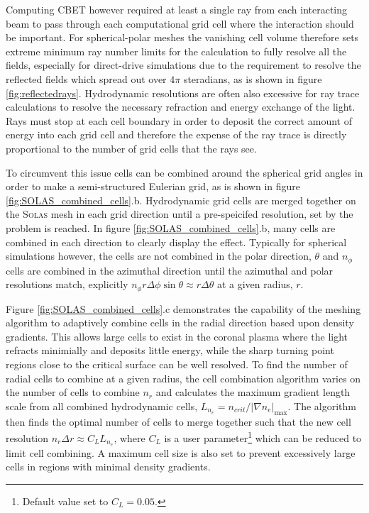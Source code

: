 Computing \ac{CBET} however required at least a single ray from each interacting beam to pass through each computational grid cell where the interaction should be important.
For spherical-polar meshes the vanishing cell volume therefore sets extreme minimum ray number limits for the calculation to fully resolve all the fields, especially for direct-drive simulations due to the requirement to resolve the reflected fields which spread out over $4\pi$ steradians, as is shown in figure \ref{fig:reflectedrays}.
Hydrodynamic resolutions are often also excessive for ray trace calculations to resolve the necessary refraction and energy exchange of the light.
Rays must stop at each cell boundary in order to deposit the correct amount of energy into each grid cell and therefore the expense of the ray trace is directly proportional to the number of grid cells that the rays see.

To circumvent this issue cells can be combined around the spherical grid angles in order to make a semi-structured Eulerian grid, as is shown in figure \ref{fig:SOLAS_combined_cells}.b.
Hydrodynamic grid cells are merged together on the \textsc{Solas} mesh in each grid direction until a pre-speicifed resolution, set by the problem is reached.
In figure \ref{fig:SOLAS_combined_cells}.b, many cells are combined in each direction to clearly display the effect.
Typically for spherical simulations however, the cells are not combined in the polar direction, $\theta$ and $n_{\phi}$ cells are combined in the azimuthal direction until the azimuthal and polar resolutions match, explicitly $n_{\phi}r\Delta\phi\sin\theta \approx r \Delta\theta$ at a given radius, $r$.

Figure \ref{fig:SOLAS_combined_cells}.c demonstrates the capability of the meshing algorithm to adaptively combine cells in the radial direction based upon density gradients.
This allows large cells to exist in the coronal plasma where the light refracts minimially and deposits little energy, while the sharp turning point regions close to the critical surface can be well resolved.
To find the number of radial cells to combine at a given radius, the cell combination algorithm varies on the number of cells to combine $n_r$ and calculates the maximum gradient length scale from all combined hydrodynamic cells, $L_{n_e}=n_{crit}/|\nabla n_e|_{\max}$.
The algorithm then finds the optimal number of cells to merge together such that the new cell resolution $n_r\Delta r \approx C_L L_{n_e}$, where $C_L$ is a user parameter\footnote{Default value set to $C_L=0.05$.} which can be reduced to limit cell combining.
A maximum cell size is also set to prevent excessively large cells in regions with minimal density gradients.

